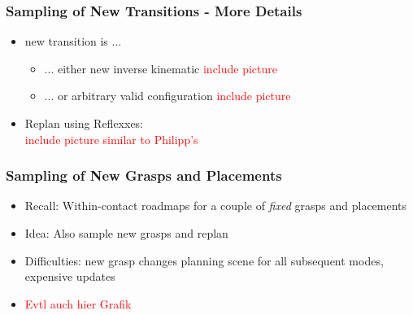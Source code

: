\documentclass[12pt, %
			  t     %
]{beamer}%
\begin{document}
\begin{frame}
\frametitle{Sampling of New Transitions - More Details}
\begin{itemize}
  \item new transition is ... 
  \begin{itemize}
    \item ... either new inverse kinematic \textcolor{red}{include picture}
    \item ... or arbitrary valid configuration \textcolor{red}{include picture}
  \end{itemize}
  \item Replan using Reflexxes:\\ \textcolor{red}{include picture similar to Philipp's}
  
\end{itemize}


\end{frame}

\begin{frame}
\frametitle{Sampling of New Grasps and Placements}
\begin{itemize}
  \item Recall: Within-contact roadmaps for a couple of \textit{fixed} grasps and placements
  \item Idea: Also sample new grasps and replan
  \item Difficulties: new grasp changes planning scene for all subsequent modes, expensive updates
  \item \textcolor{red}{Evtl auch hier Grafik}
\end{itemize}


\end{frame}
\end{document}
